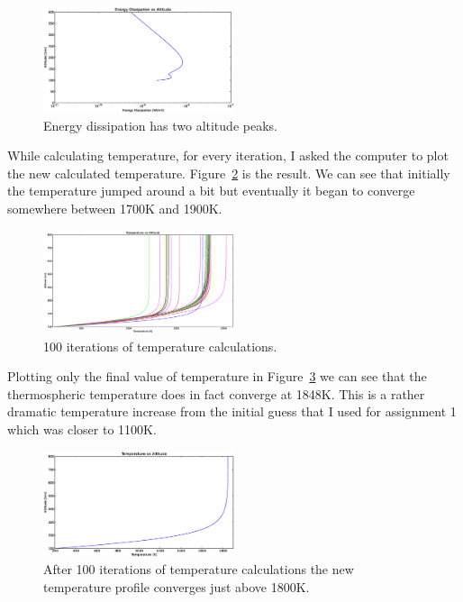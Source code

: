 \documentclass[10pt]{article}
\begin{document}
\begin{multicols}{2}
\begin{figure}[H]
	\centering
		\includegraphics[width=0.5\textwidth]{./Figures/Energy_Dissipation_vs_Altitude.eps}
	\caption{Energy dissipation has two altitude peaks.}
	\label{fig:energy_dissipation}
\end{figure}
While calculating temperature, for every iteration, I asked the computer to plot the new calculated temperature. Figure~\ref{fig:temps} is the result. We can see that initially the temperature jumped around a bit but eventually it began to converge somewhere between 1700K and 1900K.
\begin{figure}[H]
	\centering
		\includegraphics[width=0.5\textwidth]{./Figures/temps.eps}
	\caption{100 iterations of temperature calculations.}
	\label{fig:temps}
\end{figure}
Plotting only the final value of temperature in Figure~\ref{fig:temp} we can see that the thermospheric temperature does in fact converge at 1848K. This is a rather dramatic temperature increase from the initial guess that I used for assignment 1 which was closer to 1100K.
\begin{figure}[H]
	\centering
		\includegraphics[width=0.5\textwidth]{./Figures/Temperature_vs_Altitude.eps}
	\caption{After 100 iterations of temperature calculations the new temperature profile converges just above 1800K.}
	\label{fig:temp}
\end{figure}

\end{multicols}
\end{document}
